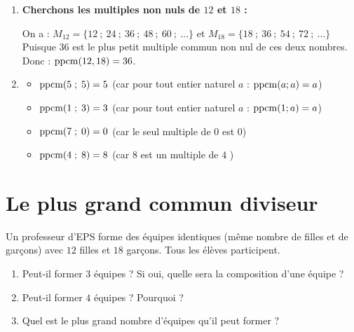 \documentclass[10pt, a4paper]{article}
\begin{document}
\begin{Solution}[APPLICATION][10]
\begin{enumerate}[leftmargin=*,itemsep=0.5pt]
    \item \textbf{Cherchons les multiples non nuls de $12$ et $18$ :}
    
    On a : $M_{12} = \big\{12~;~24~;~36~;~48~;~60~;~\dots\big\}$
    et $M_{18} = \big\{18~;~36~;~54~;~72~;~\dots\big\}$ \\
    Puisque $36$ est le plus petit multiple commun non nul de ces deux nombres. \\
    Donc : \quad $\operatorname{ppcm}(12, 18) = 36$.
    
    \item 
    \begin{itemize}[leftmargin=*,itemsep=0.5pt]
        \item $\operatorname{ppcm}(5 \; ; \; 5) = 5$ \quad 
        (car pour tout entier naturel $a$ : $\operatorname{ppcm}(a ; a) = a$)
        \item $\operatorname{ppcm}(1 \; ; \; 3) = 3$ \quad 
        (car pour tout entier naturel $a$ : $\operatorname{ppcm}(1 ; a) = a$)
        \item $\operatorname{ppcm}(7 \; ; \; 0) = 0$ \quad
        (car le seul multiple de $0$ est $0$)
        \item $\operatorname{ppcm}(4 \; ; \; 8) = 8$ \quad 
        (car $8$ est un multiple de $4$ )
    \end{itemize}
    
\end{enumerate}
\end{Solution}


\section{Le plus grand commun diviseur }

\begin{Activite}[][10 min]
Un professeur d'EPS forme des équipes identiques (même nombre de filles et de garçons) avec $12$ filles et $18$ garçons. Tous les élèves participent.

\begin{enumerate}[leftmargin=*,itemsep=0.5pt]
    \item Peut-il former $3$ équipes ? Si oui, quelle sera la composition d'une équipe ?
    \item Peut-il former $4$ équipes ? Pourquoi ?
    \item Quel est le plus grand nombre d'équipes qu'il peut former ?
\end{enumerate}
\end{Activite}
\end{document}
